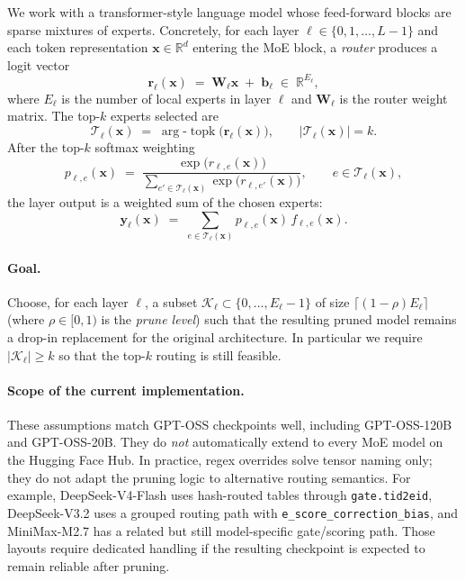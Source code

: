 \documentclass[11pt,a4paper]{article}
\newcommand{\R}{\mathbb{R}}
\newcommand{\1}{\mathbf{1}}
\newcommand{\x}{\bm{x}}
\newcommand{\W}{\bm{W}}
\newcommand{\Keep}{\mathcal{K}}
\theoremstyle{plain}
\begin{document}
We work with a transformer-style language model whose feed-forward
blocks are sparse mixtures of experts.  Concretely, for each layer
$\ell \in \{0, 1, \dots, L-1\}$ and each token representation
$\x \in \R^{d}$ entering the MoE block, a \emph{router} produces a
logit vector
\begin{equation}
  \bm{r}_\ell(\x) \;=\; \W_\ell \x \;+\; \bm{b}_\ell
  \;\in\; \R^{E_\ell},
  \label{eq:router}
\end{equation}
where $E_\ell$ is the number of local experts in layer $\ell$ and
$\W_\ell$ is the router weight matrix.  The top-$k$ experts selected
are
\begin{equation}
  \mathcal{T}_\ell(\x) \;=\; \arg\text{-}\!\operatorname{topk}\!\bigl(\bm{r}_\ell(\x)\bigr),
  \qquad |\mathcal{T}_\ell(\x)| = k.
  \label{eq:topk}
\end{equation}
After the top-$k$ softmax weighting
\begin{equation}
  p_{\ell,e}(\x) \;=\;
    \frac{\exp\!\bigl(r_{\ell,e}(\x)\bigr)}
         {\sum_{e' \in \mathcal{T}_\ell(\x)} \exp\!\bigl(r_{\ell,e'}(\x)\bigr)},
  \qquad e \in \mathcal{T}_\ell(\x),
  \label{eq:softmax}
\end{equation}
the layer output is a weighted sum of the chosen experts:
\begin{equation}
  \bm{y}_\ell(\x) \;=\; \sum_{e \in \mathcal{T}_\ell(\x)} p_{\ell,e}(\x) \,
                                f_{\ell,e}(\x).
  \label{eq:moe}
\end{equation}

\paragraph{Goal.}
Choose, for each layer $\ell$, a subset $\Keep_\ell \subset \{0, \dots, E_\ell - 1\}$
of size $\lceil (1 - \rho) E_\ell \rceil$ (where $\rho \in [0,1)$ is the
\emph{prune level}) such that the resulting pruned model remains a
drop-in replacement for the original architecture.  In particular we
require $|\Keep_\ell| \ge k$ so that the top-$k$ routing is still
feasible.

\paragraph{Scope of the current implementation.}
These assumptions match GPT-OSS checkpoints well, including
GPT-OSS-120B and GPT-OSS-20B.  They do \emph{not} automatically extend
to every MoE model on the Hugging Face Hub.  In practice, regex
overrides solve tensor naming only; they do not adapt the pruning logic
to alternative routing semantics.  For example, DeepSeek-V4-Flash uses
hash-routed tables through \texttt{gate.tid2eid}, DeepSeek-V3.2 uses a
grouped routing path with \texttt{e\_score\_correction\_bias}, and
MiniMax-M2.7 has a related but still model-specific gate/scoring path.
Those layouts require dedicated handling if the resulting checkpoint is
expected to remain reliable after pruning.
\end{document}
